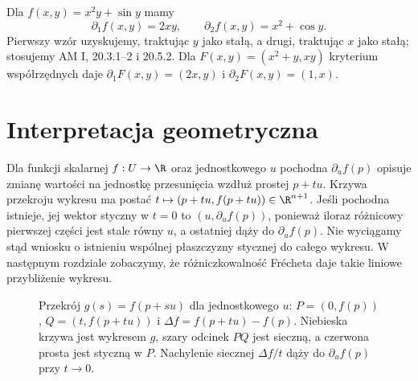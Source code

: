 \begin{przyklad}
Dla $f(x,y)=x^2y+\sin y$ mamy
\[
 \partial_1 f(x,y)=2xy,\qquad
 \partial_2 f(x,y)=x^2+\cos y.
\]
Pierwszy wzór uzyskujemy, traktując $y$ jako stałą,
a drugi, traktując $x$ jako stałą; stosujemy AM I,
20.3.1--2 i 20.5.2.
Dla $F(x,y)=(x^2+y,xy)$ kryterium współrzędnych
daje $\partial_1F(x,y)=(2x,y)$ i
$\partial_2F(x,y)=(1,x)$.
\end{przyklad}

\section{Interpretacja geometryczna}

Dla funkcji skalarnej $f:U\to\R$ oraz jednostkowego
$u$ pochodna $\partial_u f(p)$ opisuje zmianę wartości
na jednostkę przesunięcia wzdłuż prostej $p+tu$.
Krzywa przekroju wykresu ma postać
$t\mapsto(p+tu,f(p+tu))\in\R^{n+1}$.
Jeśli pochodna istnieje, jej wektor styczny w $t=0$
to $(u,\partial_u f(p))$, ponieważ iloraz różnicowy
pierwszej części jest stale równy $u$, a ostatniej
dąży do $\partial_u f(p)$.
Nie wyciągamy stąd wniosku o istnieniu wspólnej
płaszczyzny stycznej do całego wykresu. W następnym
rozdziale zobaczymy, że różniczkowalność Frécheta
daje takie liniowe przybliżenie wykresu.

\begin{figure}[htbp]
\centering
{}
\caption{Przekrój $g(s)=f(p+su)$ dla jednostkowego $u$:
$P=(0,f(p))$, $Q=(t,f(p+tu))$ i $\Delta f=f(p+tu)-f(p)$.
Niebieska krzywa jest wykresem $g$, szary odcinek $PQ$
jest sieczną, a czerwona prosta jest styczną w $P$.
Nachylenie siecznej $\Delta f/t$ dąży do $\partial_u f(p)$
przy $t\to0$.}
\label{ma2:fig:directional-section}
\end{figure}
\FloatBarrier

